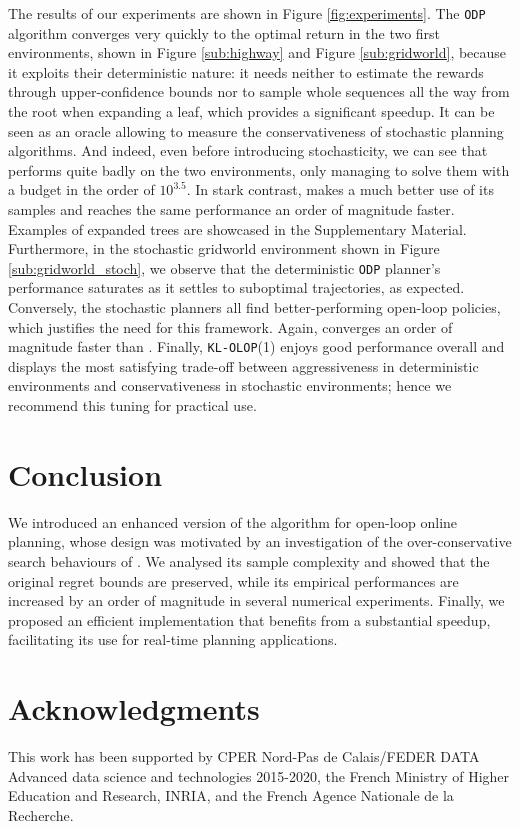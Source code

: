\documentclass[runningheads, envcountsame, a4paper]{llncs}
\begin{document}
The results of our experiments are shown in Figure \ref{fig:experiments}. The \texttt{ODP} algorithm converges very quickly to the optimal return in the two first environments, shown in Figure \ref{sub:highway} and Figure \ref{sub:gridworld}, because it exploits their deterministic nature: it needs neither to estimate the rewards through upper-confidence bounds nor to sample whole sequences all the way from the root when expanding a leaf, which provides a significant speedup. It can be seen as an oracle allowing to measure the conservativeness of stochastic planning algorithms. And indeed, even before introducing stochasticity, we can see that \OLOP performs quite badly on the two environments, only managing to solve them with a budget in the order of $10^{3.5}$. In stark contrast, \KLOLOP makes a much better use of its samples and reaches the same performance an order of magnitude faster. Examples of expanded trees are showcased in the Supplementary Material. Furthermore, in the stochastic gridworld environment shown in Figure \ref{sub:gridworld_stoch}, we observe that the deterministic \texttt{ODP} planner's performance saturates as it settles to suboptimal trajectories, as expected. Conversely, the stochastic planners all find better-performing open-loop policies, which justifies the need for this framework. Again, \KLOLOP converges an order of magnitude faster than \OLOP. Finally, \texttt{KL-OLOP}(1) enjoys good performance overall and displays the most satisfying trade-off between aggressiveness in deterministic environments and conservativeness in stochastic environments; hence we recommend this tuning for practical use.

\section{Conclusion}

We introduced an enhanced version of the \OLOP algorithm for open-loop online planning, whose design was motivated by an investigation of the over-conservative search behaviours of \OLOP. We analysed its sample complexity and showed that the original regret bounds are preserved, while its empirical performances are increased by an order of magnitude in several numerical experiments. Finally, we proposed an efficient implementation that benefits from a substantial speedup, facilitating its use for real-time planning applications.

\section*{Acknowledgments}
This work has been supported by CPER Nord-Pas de Calais/FEDER DATA Advanced data science and technologies 2015-2020, the French Ministry of Higher Education and Research, INRIA, and the French Agence Nationale de la Recherche.
\end{document}
